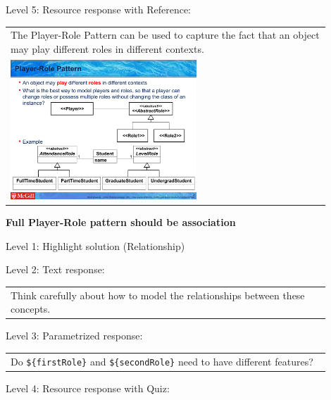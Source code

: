 \noindent Level 5: Resource response with Reference: \medskip

\begin{tabular}{|p{0.9\linewidth}}
The Player-Role Pattern can be used to capture the fact that an object may play different roles
in different contexts.

\\
\includegraphics[width=0.6\textwidth]{images/player_role.png}
\end{tabular} \medskip


\noindent \textbf{Full Player-Role pattern should be association} \medskip

\noindent Level 1: Highlight solution (Relationship) \medskip

\noindent Level 2: Text response: \medskip

\begin{tabular}{|p{0.9\linewidth}}
Think carefully about how to model the relationships between these concepts.
\end{tabular} \medskip

\noindent Level 3: Parametrized response: \medskip

\begin{tabular}{|p{0.9\linewidth}}
Do \verb|${firstRole}| and \verb|${secondRole}| need to have different features?
\end{tabular} \medskip

\noindent Level 4: Resource response with Quiz: \medskip


